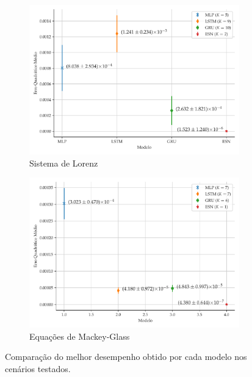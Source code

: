 \documentclass[a4paper, 12pt]{article}
\begin{document}
\begin{figure}[H]
\begin{subfigure}[t]{0.45\textwidth}
     \end{subfigure}
     \centering
     \\
     \begin{subfigure}[t]{0.45\textwidth}
     \centering
         \includegraphics[scale=0.385]{comparacao-k-lorenz.pdf}
         \caption{Sistema de Lorenz}
     \end{subfigure}
     \centering
     \begin{subfigure}[t]{0.45\textwidth} 
     \centering
         \includegraphics[scale=0.385]{comparacao-k-mackeyglass.pdf}
         \caption{Equações de Mackey-Glass}
     \end{subfigure}  
     \centering   
     \caption{Comparação do melhor desempenho obtido por cada modelo nos cenários testados.}
     \label{fig:model-comparison}
\end{figure}
\end{document}
